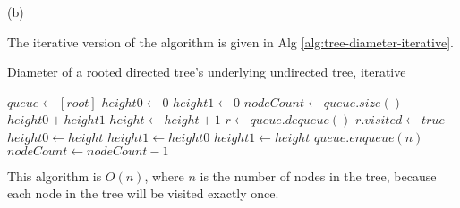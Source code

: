 \documentclass{article}
\begin{document}
\begin{description}
  (b)

  The iterative version of the algorithm is given in Alg \ref{alg:tree-diameter-iterative}.

  \begin{algorithm}[h]
  \caption{Diameter of a rooted directed tree's underlying undirected tree, iterative}
  \label{alg:tree-diameter-iterative}
    \begin{algorithmic}[1]
      \State $queue \gets [root]$
      \State $height0 \gets 0$
      \State $height1 \gets 0$
        \State $nodeCount \gets queue.size()$
          \State \Return $height0 + height1$
        \EndIf
        \State $height \gets height + 1$
          \State $r \gets queue.dequeue()$
          \State $r.visited \gets true$
              \State $height0 \gets height$
              \State $height1 \gets height0$
              \State $height1 \gets height$
            \EndIf
          \Else
              \State $queue.enqueue(n)$
            \EndFor
          \EndIf
          \State $nodeCount \gets nodeCount - 1$
        \EndWhile
      \EndWhile
    \EndFunction
    \end{algorithmic}
  \end{algorithm}

  This algorithm is $O(n)$, where $n$ is the number of nodes in the tree, because each node in the tree will be visited exactly once.

\end{description}
\end{document}
